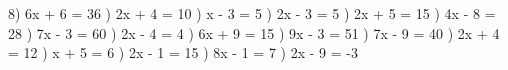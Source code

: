 \documentclass{article}%
\begin{document}
8) 6x + 6 = 36%
\newline%
\newline%
) 2x + 4 = 10%
\newline%
\newline%
) x - 3 = 5%
\newline%
\newline%
) 2x - 3 = 5%
\newline%
\newline%
) 2x + 5 = 15%
\newline%
\newline%
) 4x - 8 = 28%
\newline%
\newline%
) 7x - 3 = 60%
\newline%
\newline%
) 2x - 4 = 4%
\newline%
\newline%
) 6x + 9 = 15%
\newline%
\newline%
) 9x - 3 = 51%
\newline%
\newline%
) 7x - 9 = 40%
\newline%
\newline%
) 2x + 4 = 12%
\newline%
\newline%
) x + 5 = 6%
\newline%
\newline%
) 2x - 1 = 15%
\newline%
\newline%
) 8x - 1 = 7%
\newline%
\newline%
) 2x - 9 = -3%
\newline%
\newline%
\end{document}
